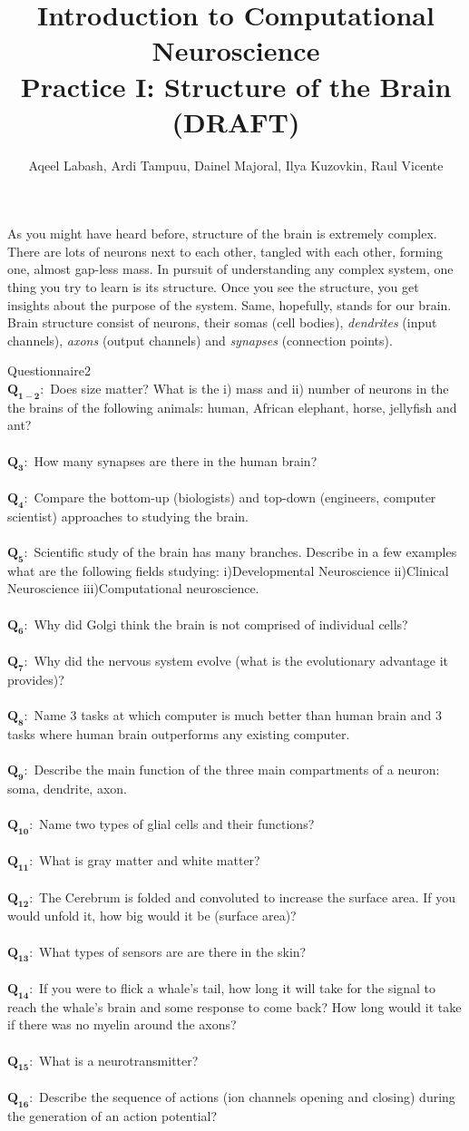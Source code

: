 \documentclass[a4paper,11pt]{article}
\author{\large{Aqeel Labash, Ardi Tampuu, Dainel Majoral, Ilya Kuzovkin, Raul Vicente}}
\title{\huge{Introduction to Computational Neuroscience}\\\LARGE{Practice I: Structure of the Brain\\ (DRAFT)}}
\newcommand{\question}[2]{\setlength\parindent{0mm}\ \\$\mathbf{Q_{#1}:}$ #2\ \\}
\begin{document}
\maketitle

As you might have heard before, structure of the brain is extremely complex. There are lots of neurons next to each other, tangled with each other, forming one, almost gap-less mass. In pursuit of understanding any complex system, one thing you try to learn is its structure. Once you see the structure, you get insights about the purpose of the system. Same, hopefully, stands for our brain. Brain structure consist of neurons, their somas (cell bodies), \emph{dendrites} (input channels), \emph{axons} (output channels) and \emph{synapses} (connection points). 


%
%
\begin{exercise}{1}{Questionnaire}{2}
\question{1-2}{Does size matter? What is the i) mass and ii) number of neurons in the the brains of the following animals: human, African elephant, horse, jellyfish and ant?}
\question{3}{How many synapses are there in the human brain?}
\question{4}{Compare the bottom-up (biologists) and top-down (engineers, computer scientist) approaches to studying the brain.}
\question{5}{Scientific study of the brain has many branches. Describe in a few examples what are the following fields studying: i)Developmental Neuroscience ii)Clinical Neuroscience iii)Computational neuroscience.}
\question{6}{Why did Golgi think the brain is not comprised of individual cells?}
\question{7}{Why did the nervous system evolve (what is the evolutionary advantage it provides)?}
\question{8}{Name 3 tasks at which computer is much better than human brain and 3 tasks where human brain outperforms any existing computer.}
\question{9}{Describe the main function of the three main compartments of a neuron: soma, dendrite, axon.}
\question{10}{Name two types of glial cells and their functions?}
\question{11}{What is gray matter and white matter?}
\question{12}{The Cerebrum is folded and convoluted to increase the surface area. If you would unfold it, how big would it be (surface area)?}
\question{13}{What types of sensors are are there in the skin?}
\question{14}{If you were to flick a whale's tail, how long it will take for the signal to reach the whale's brain and some response to come back? How long would it take if there was no myelin around the axons? }
\question{15}{What is a neurotransmitter?}
\question{16}{Describe the sequence of actions (ion channels opening and closing) during the generation of an action potential?}
\end{exercise}
\end{document}
